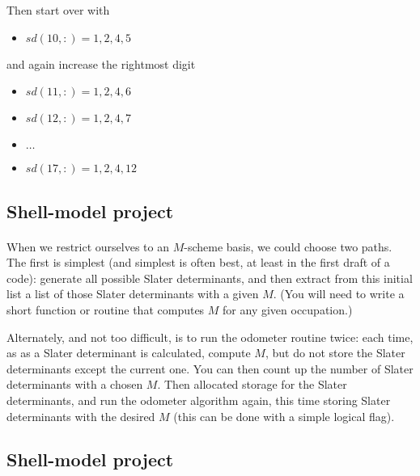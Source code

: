 \noindent
Then start over with 
\begin{itemize}
\item $sd(10,:)= 1,2,4,5$
\end{itemize}

\noindent
and again increase the rightmost digit

\begin{itemize}
\item $sd(11,:)= 1,2,4,6$

\item $sd(12,:)= 1,2,4,7$

\item $\ldots$

\item $sd(17,:)= 1,2,4,12$
\end{itemize}

\noindent



\subsection*{Shell-model project}

\paragraph{}
When we restrict ourselves to an $M$-scheme basis, we could choose two paths. 
The first is simplest (and simplest is often best, at 
least in the first draft of a code): generate all possible Slater determinants, 
and then extract from this initial list a list of those Slater determinants with a given 
$M$. (You will need to write a short function or routine that computes $M$ for any 
given occupation.)  

Alternately, and not too difficult, is to run the odometer routine twice: each time, as 
as a Slater determinant is calculated, compute $M$, but do not store the Slater determinants 
except the current one. You can then count up the number of Slater determinants with a 
chosen $M$.  Then allocated storage for the Slater determinants, and run the odometer 
algorithm again, this time storing Slater determinants with the desired $M$ (this can be 
done with a simple logical flag).



\subsection*{Shell-model project}

